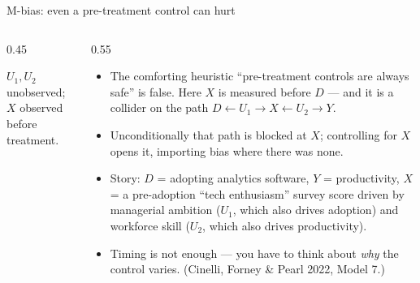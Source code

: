 \documentclass[aspectratio=169,11pt]{beamer}
\begin{document}
\begin{frame}{M-bias: even a pre-treatment control can hurt}
\begin{columns}
\begin{column}{0.45\textwidth}
\begin{center}
\end{center}
\smallskip
{\small $U_1, U_2$ unobserved; $X$ observed \alert{before} treatment.}
\end{column}
\begin{column}{0.55\textwidth}
\begin{itemize}
	\item The comforting heuristic ``pre-treatment controls are always safe'' is
	\alert{false}. Here $X$ is measured before $D$ --- and it is a \alert{collider}
	on the path $D \leftarrow U_1 \rightarrow X \leftarrow U_2 \rightarrow Y$.

	\item Unconditionally that path is blocked at $X$; \alert{controlling for $X$
	opens it}, importing bias where there was none.

	\item Story: $D$ = adopting analytics software, $Y$ = productivity, $X$ = a
	pre-adoption ``tech enthusiasm'' survey score driven by managerial ambition
	($U_1$, which also drives adoption) and workforce skill ($U_2$, which also
	drives productivity).

	\item Timing is not enough --- you have to think about \emph{why} the control
	varies. (Cinelli, Forney \& Pearl 2022, Model 7.)
\end{itemize}
\end{column}
\end{columns}
\end{frame}
\end{document}
